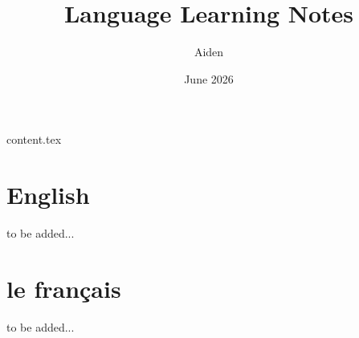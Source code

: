 \documentclass[a4paper]{book}
\begin{document}
\setcounter{tocdepth}{1}

\frontmatter

\title{Language Learning Notes}
\author{Aiden}
\date{June 2026}
\maketitle

\tableofcontents


\mainmatter

\part{}

{content.tex}


\part{English}

to be added...

\part{le français}

to be added...


\backmatter
\end{document}
